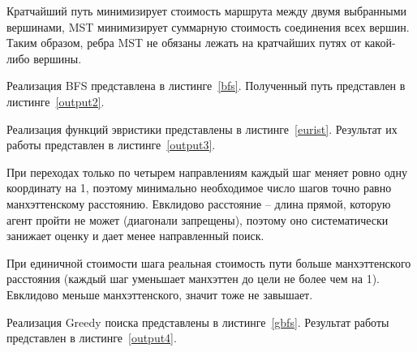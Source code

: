 Кратчайший путь минимизирует стоимость маршрута между двумя выбранными вершинами, MST минимизирует суммарную стоимость соединения всех вершин. Таким образом, ребра MST не обязаны лежать на кратчайших путях от какой-либо вершины.


Реализация BFS представлена в листинге~\ref{bfs}.
Полученный путь представлен в листинге~\ref{output2}.






Реализация функций эвристики представлены в листинге~\ref{eurist}.
Результат их работы представлен в листинге~\ref{output3}.





При переходах только по четырем направлениям каждый шаг меняет ровно одну координату на 1, поэтому минимально необходимое число шагов точно равно манхэттенскому расстоянию. 
Евклидово расстояние -- длина прямой, которую агент пройти не может (диагонали запрещены), поэтому оно систематически занижает оценку и дает менее направленный поиск.

При единичной стоимости шага реальная стоимость пути больше манхэттенского расстояния (каждый шаг уменьшает манхэттен до цели не более чем на 1). Евклидово меньше манхэттенского, значит тоже не завышает.


Реализация Greedy поиска представлены в листинге~\ref{gbfs}.
Результат работы представлен в листинге~\ref{output4}.

